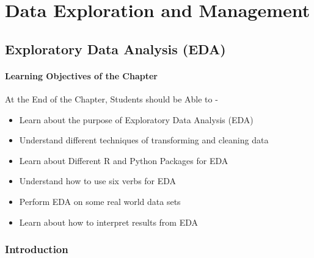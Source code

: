 \documentclass[
  letterpaper,
  DIV=11,
  numbers=noendperiod]{scrreprt}
\begin{document}
\part{Data Exploration and Management}

\chapter{Exploratory Data Analysis
(EDA)}\label{exploratory-data-analysis-eda}

\subsection*{Learning Objectives of the
Chapter}\label{learning-objectives-of-the-chapter-2}

\begin{tcolorbox}[enhanced jigsaw, arc=.35mm, bottomrule=.15mm, bottomtitle=1mm, breakable, colback=white, colbacktitle=quarto-callout-note-color!10!white, colframe=quarto-callout-note-color-frame, coltitle=black, left=2mm, leftrule=.75mm, opacityback=0, opacitybacktitle=0.6, rightrule=.15mm, title=\textcolor{quarto-callout-note-color}{\faInfo}\hspace{0.5em}{Learning Objectives}, titlerule=0mm, toprule=.15mm, toptitle=1mm]

At the End of the Chapter, Students should be Able to -

\begin{itemize}
\item
  Learn about the purpose of Exploratory Data Analysis (EDA)
\item
  Understand different techniques of transforming and cleaning data
\item
  Learn about Different R and Python Packages for EDA
\item
  Understand how to use six verbs for EDA
\item
  Perform EDA on some real world data sets
\item
  Learn about how to interpret results from EDA
\end{itemize}

\end{tcolorbox}

\section{Introduction}\label{introduction}
\end{document}

